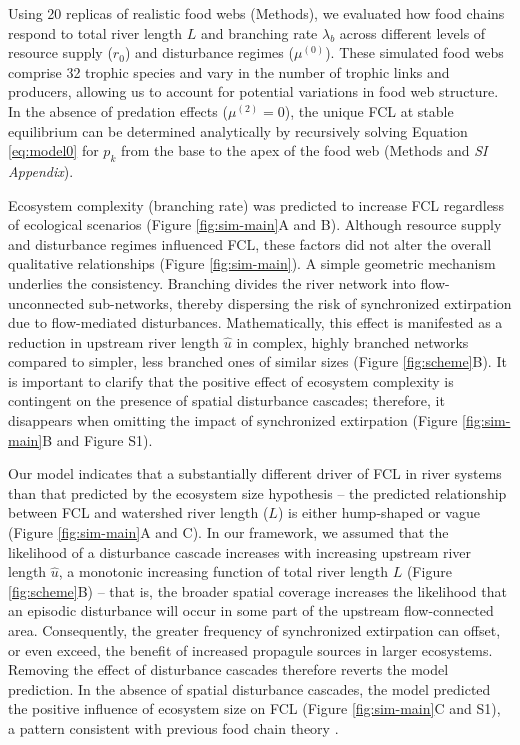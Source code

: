 \documentclass[11pt, class=article, crop=false]{standalone}
\begin{document}


Using 20 replicas of realistic food webs (Methods), we evaluated how food chains respond to total river length $L$ and branching rate $\lambda_b$ across different levels of resource supply ($r_0$) and disturbance regimes ($\mu^{(0)}$).
These simulated food webs comprise 32 trophic species and vary in the number of trophic links and producers, allowing us to account for potential variations in food web structure.
In the absence of predation effects ($\mu^{(2)} = 0$), the unique FCL at stable equilibrium can be determined analytically by recursively solving Equation \ref{eq:model0} for $p_k$ from the base to the apex of the food web (Methods and \textit{SI Appendix}).

Ecosystem complexity (branching rate) was predicted to increase FCL regardless of ecological scenarios (Figure \ref{fig:sim-main}A and B).
Although resource supply and disturbance regimes influenced FCL, these factors did not alter the overall qualitative relationships (Figure \ref{fig:sim-main}).
A simple geometric mechanism underlies the consistency.
Branching divides the river network into flow-unconnected sub-networks, thereby dispersing the risk of synchronized extirpation due to flow-mediated disturbances.
Mathematically, this effect is manifested as a reduction in upstream river length $\hat{u}$ in complex, highly branched networks compared to simpler, less branched ones of similar sizes (Figure \ref{fig:scheme}B).
It is important to clarify that the positive effect of ecosystem complexity is contingent on the presence of spatial disturbance cascades; therefore, it disappears when omitting the impact of synchronized extirpation (Figure \ref{fig:sim-main}B and Figure S1).

Our model indicates that a substantially different driver of FCL in river systems than that predicted by the ecosystem size hypothesis -- the predicted relationship between FCL and watershed river length ($L$) is either hump-shaped or vague (Figure \ref{fig:sim-main}A and C).
In our framework, we assumed that the likelihood of a disturbance cascade increases with increasing upstream river length $\hat{u}$, a monotonic increasing function of total river length $L$ (Figure \ref{fig:scheme}B) -- that is, the broader spatial coverage increases the likelihood that an episodic disturbance will occur in some part of the upstream flow-connected area.
Consequently, the greater frequency of synchronized extirpation can offset, or even exceed, the benefit of increased propagule sources in larger ecosystems.
Removing the effect of disturbance cascades therefore reverts the model prediction. 
In the absence of spatial disturbance cascades, the model predicted the positive influence of ecosystem size on FCL (Figure \ref{fig:sim-main}C and S1), a pattern consistent with previous food chain theory \citep{holt_food_2002, takimoto_effects_2012, terui_spatial_2019, guo_towards_2023}.
\end{document}
